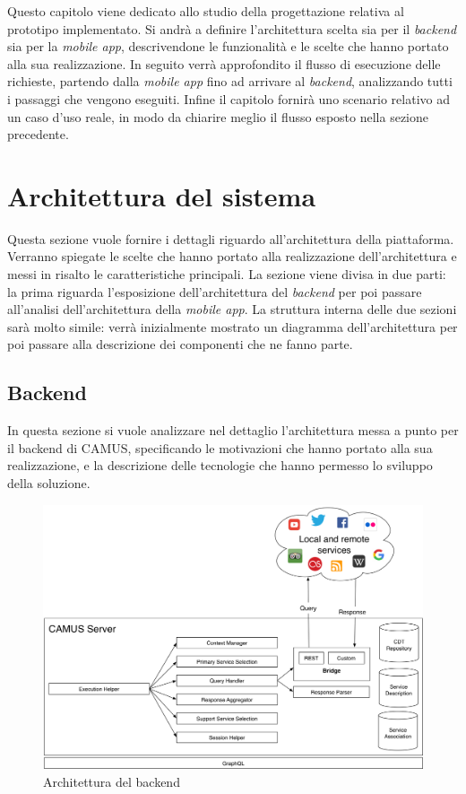 Questo capitolo viene dedicato allo studio della progettazione relativa al prototipo implementato. Si andrà a definire l'architettura scelta sia per il \emph{backend} sia per la \emph{mobile app}, descrivendone le funzionalità e le scelte che hanno portato alla sua realizzazione. In seguito verrà approfondito il flusso di esecuzione delle richieste, partendo dalla \emph{mobile app} fino ad arrivare al \emph{backend}, analizzando tutti i passaggi che vengono eseguiti. Infine il capitolo fornirà uno scenario relativo ad un caso d'uso reale, in modo da chiarire meglio il flusso esposto nella sezione precedente.

\section{Architettura del sistema}

Questa sezione vuole fornire i dettagli riguardo all'architettura della piattaforma. Verranno spiegate le scelte che hanno portato alla realizzazione dell'architettura e messi in risalto le caratteristiche principali. La sezione viene divisa in due parti: la prima riguarda l'esposizione dell'architettura del \emph{backend} per poi passare all'analisi dell'architettura della \emph{mobile app}. La struttura interna delle due sezioni sarà molto simile: verrà inizialmente mostrato un diagramma dell'architettura per poi passare alla descrizione dei componenti che ne fanno parte. 

\subsection{Backend\label{sec:architettura-backend}}

In questa sezione si vuole analizzare nel dettaglio l'architettura messa a punto per il backend di CAMUS, specificando le motivazioni che hanno portato alla sua realizzazione, e la descrizione delle tecnologie che hanno permesso lo sviluppo della soluzione.

\begin{figure}[ht]
	\centering
	\includegraphics[width=\textwidth]{4-progettazione-alto-livello/Immagini/camus-architecture-backend.png}
	\caption{Architettura del backend}\label{fig:architettura-backend}
\end{figure}

